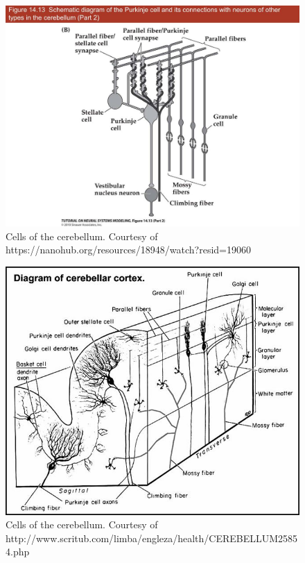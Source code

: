 \documentclass{article}
\theoremstyle{definition}
\begin{document}
\begin{figure}
\includegraphics[width=\linewidth]{nanohub/029.png}
\caption{Cells of the cerebellum. Courtesy of
  https://nanohub.org/resources/18948/watch?resid=19060}
\label{fig-physical-2}
\end{figure}

\begin{figure}
\includegraphics[width=\linewidth]{nanohub/image004.png}
\caption{Cells of the cerebellum. Courtesy of http://www.scritub.com/limba/engleza/health/CEREBELLUM25854.php}
\label{fig-physical-3}
\end{figure}
\end{document}
